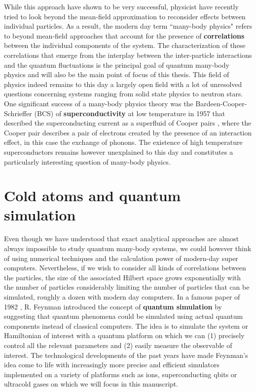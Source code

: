 While this approach have shown to be very successful, physicist have recently tried to look beyond the mean-field approximation to reconsider effects between individual particles. As a result, the modern day term ``many-body physics" refers to beyond mean-field approaches that account for the presence of \textbf{correlations} between the individual components of the system. The characterization of these correlations that emerge from the interplay between the inter-particle interactions and the quantum fluctuations is the principal goal of quantum many-body physics and will also be the main point of focus of this thesis. This field of physics indeed remains to this day a largely open field with a lot of unresolved questions concerning systems ranging from solid state physics to neutron stars. One significant success of a many-body physics theory was the Bardeen-Cooper-Schrieffer \cite{bardeen1957theory} (BCS) of \textbf{superconductivity} at low temperature in 1957 that described the superconducting current as a superfluid of Cooper pairs \cite{cooper1956bound}, where the Cooper pair describes a pair of electrons created by the presence of an interaction effect, in this case the exchange of phonons. The existence of high temperature superconductors remains however unexplained to this day and constitutes a particularly interesting question of many-body physics.

\section*{Cold atoms and quantum simulation}

Even though we have understood that exact analytical approaches are almost always impossible to study quantum many-body systems, we could however think of using numerical techniques and the calculation power of modern-day super computers. Nevertheless, if we wish to consider all kinds of correlations between the particles, the size of the associated Hilbert space grows exponentially with the number of particles considerably limiting the number of particles that can be simulated, roughly a dozen with modern day computers. In a famous paper of 1982 \cite{Feynman1982Simulating}, R. Feynman introduced the concept of \textbf{quantum simulation} by suggesting that quantum phenomena could be simulated using actual quantum components instead of classical computers. The idea is to simulate the system or Hamiltonian of interest with a quantum platform on which we can (1) precisely control all the relevant parameters and (2) easily measure the observable of interest. The technological developments of the past years have made Feynman's idea come to life with increasingly more precise and efficient simulators implemented on a variety of platforms such as ions, superconducting qbits or ultracold gases on which we will focus in this manuscript. 

